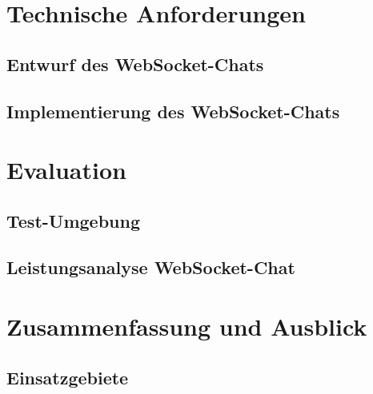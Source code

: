 \documentclass[11pt,a4paper,titlepage]{scrartcl}
\numberwithin{equation}{section}
\begin{document}
\section{Technische Anforderungen}
\subsection{Entwurf des WebSocket-Chats}
\subsection{Implementierung des WebSocket-Chats}

\section{Evaluation}
\subsection{Test-Umgebung}
\subsection{Leistungsanalyse WebSocket-Chat}

\section{Zusammenfassung und Ausblick}
\subsection{Einsatzgebiete}

\newpage
{}
\printbibliography
\newpage
\listoffigures
\newpage
\listoftables
\newpage
\lstlistoflistings
\end{document}
